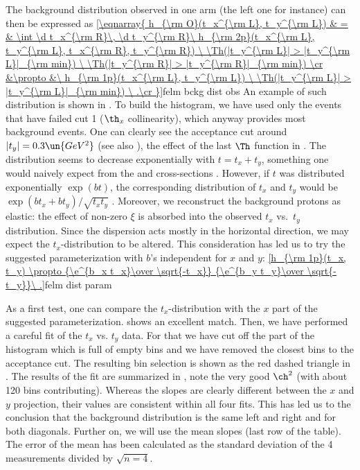 The background distribution observed in one arm (the left one for instance) can then be expressed as
\eqref{\eqnarray{
h_{\rm O}(t_x^{\rm L}, t_y^{\rm L}) & = &
\int \d t_x^{\rm R}\, \d t_y^{\rm R}\ h_{\rm 2p}(t_x^{\rm L}, t_y^{\rm L}, t_x^{\rm R}, t_y^{\rm R})
	\ \Th(|t_y^{\rm L}| > |t_y^{\rm L}|_{\rm min})
	\ \Th(|t_y^{\rm R}| > |t_y^{\rm R}|_{\rm min})
\cr
&\propto &\ h_{\rm 1p}(t_x^{\rm L}, t_y^{\rm L})
	\ \Th(|t_y^{\rm L}| > |t_y^{\rm L}|_{\rm min})
\ .\cr
}}{felm bckg dist obs}
An example of such distribution is shown in . To build the histogram, we have used only the events that have failed cut 1 ($\th_x$ collinearity), which anyway provides most background events. One can clearly see the acceptance cut around $|t_y| = 0.3\un{GeV^2}$ (see also ), the effect of the last $\Th$ function in . The distribution seems to decrease exponentially with $t = t_x + t_y$, something one would naively expect from the  and  cross-sections . However, if $t$ was distributed exponentially $\exp(b t)$, the corresponding distribution of $t_x$ and $t_y$ would be $\exp(b t_x + b t_y)/\sqrt{t_x t_y}$
. Moreover, we reconstruct the background protons as elastic: the effect of non-zero $\xi$ is absorbed into the observed $t_x$ vs.~$t_y$ distribution. Since the dispersion acts mostly in the horizontal direction, we may expect the $t_x$-distribution to be altered. This consideration has led us to try the suggested parameterization with $b$'s independent for $x$ and $y$:
\eqref{h_{\rm 1p}(t_x, t_y) \propto {\e^{b_x t_x}\over \sqrt{-t_x}} {\e^{b_y t_y}\over \sqrt{-t_y}}\ .}{felm dist param}

As a first test, one can compare the $t_x$-distribution with the $x$ part of the suggested parameterization.  shows an excellent match. Then, we have performed a careful fit of the $t_x$ vs. $t_y$ data. For that we have cut off the part of the histogram which is full of empty bins and we have removed the closest bins to the acceptance cut. The resulting bin selection is shown as the red dashed triangle in . The results of the fit are summarized in , note the very good $\ch^2$ (with about 120 bins contributing). Whereas the slopes are clearly different between the $x$ and $y$ projection, their values are consistent within all four fits. This has led us to the conclusion that the background distribution is the same left and right and for both diagonals. Further on, we will use the mean slopes (last row of the table). The error of the mean has been calculated as the standard deviation of the 4 measurements divided by $\sqrt{n = 4}$.

